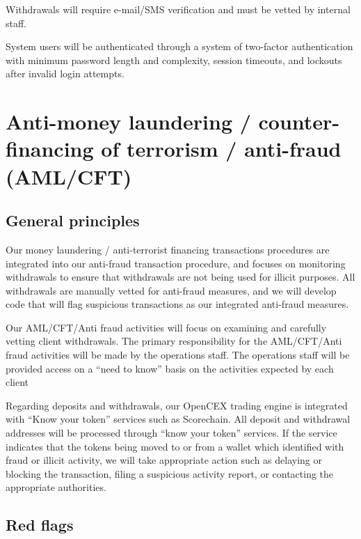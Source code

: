 Withdrawals will require e-mail/SMS verification and must be vetted by
internal staff.

System users will be authenticated through a system of two-factor
authentication with minimum password length and complexity, session
timeouts, and lockouts after invalid login attempts.

\section{Anti-money laundering / counter-financing of terrorism /
  anti-fraud (AML/CFT)}

\subsection{General principles}

Our money laundering / anti-terrorist financing transactions
procedures are integrated into our anti-fraud transaction procedure,
and focuses on monitoring withdrawals to ensure that withdrawals are
not being used for illicit purposes.  All withdrawals are manually
vetted for anti-fraud measures, and we will develop code that will
flag suspicious transactions as our integrated anti-fraud measures.

Our AML/CFT/Anti fraud activities will focus on examining and
carefully vetting client withdrawals.  The primary responsibility for
the AML/CFT/Anti fraud activities will be made by the operations
staff.  The operations staff will be provided access on a ``need to
know'' basis on the activities expected by each client

Regarding deposits and withdrawals, our OpenCEX trading engine
is integrated with ``Know your token'' services such as Scorechain.
All deposit and withdrawal addresses will be processed through ``know
your token'' services.  If the service indicates that
the tokens being moved to or from a wallet which identified with fraud
or illicit activity, we will take appropriate action such as
delaying or blocking the transaction, filing a suspicious activity
report, or contacting the appropriate authorities.


\subsection{Red flags}

